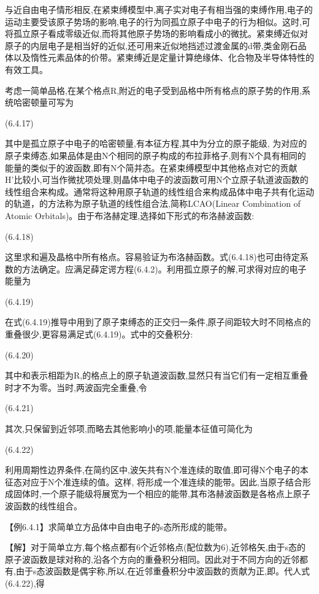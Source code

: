 与近自由电子情形相反,在紧束缚模型中,离子实对电子有相当强的束缚作用,电子的运动主要受该原子势场的影响,电子的行为同孤立原子中电子的行为相似。这时,可将孤立原子看成零级近似,而将其他原子势场的影响看成小的微扰。紧束缚近似对原子的内层电子是相当好的近似,还可用来近似地挡述过渡金属的d带,类金刚石品体以及惰性元素品体的价带。紧柬缚近是定量计算绝缘体、化合物及半导体特性的有效工具。

考虑一简单品格,在某个格点R,附近的电子受到品格中所有格点的原子势的作用,系统哈密顿量可写为

 	(6.4.17)

其中是孤立原子中电子的哈密顿量,有本征方程,其中为分立的原子能级, 为对应的原子束缚态,如果品体是由N个相同的原子构成的布拉菲格子,则有N个具有相同的能量的类似于的波函数,即有N个简并态。在紧束缚模型中其他格点对它的贡献H'比较小,可当作微扰项处理,则晶体中电子的波函数可用N个立原子轨道波函数的线性组合来构成。通常将这种用原子轨道的线性组合来构成品体中电子共有化运动的轨道，的方法称为原子轨道的线性组合法,简称LCAO(Linear Combination of Atomic Orbitals)。由于布洛赫定理,选择如下形式的布洛赫波函数:

 	(6.4.18)

这里求和遍及晶格中所有格点。容易验证为布洛赫函数。式(6.4.18)也可由待定系数的方法确定。应满足薛定谔方程(6.4.2)。利用孤立原子的解,可求得对应的电子能量为

 	(6.4.19)

在式(6.4.19)推导中用到了原子束缚态的正交归一条件,原子间距较大时不同格点的重叠很少,更容易满足式(6.4.19)。式中的交叠积分:

 	(6.4.20)

其中和表示相距为R,的格点上的原子轨道波函数,显然只有当它们有一定相互重叠时才不为零。当时,两波函完全重叠,令

 	(6.4.21)

其次,只保留到近邻项,而略去其他影响小的项,能量本征值可简化为

 	(6.4.22)

利用周期性边界条件,在简约区中,波矢共有N个准连续的取值,即可得N个电子的本征态对应于N个准连续的值。这样, 将形成一个准连续的能带。因此,当原子结合形成固体时,一个原子能级将展宽为一个相应的能带,其布洛赫波函数是各格点上原子波函数的线性组合。

【例6.4.1】求简单立方品体中自由电子的s态所形成的能带。

【解】对于简单立方,每个格点都有6个近邻格点(配位数为6),近邻格矢,由于s态的原子波函数是球对称的,沿各个方向的重叠积分相同。因此对于不同方向的近邻都有,由于s态波函数是偶宇称,所以,在近邻重叠积分中波函数的贡献为正,即。代人式(6.4.22),得




